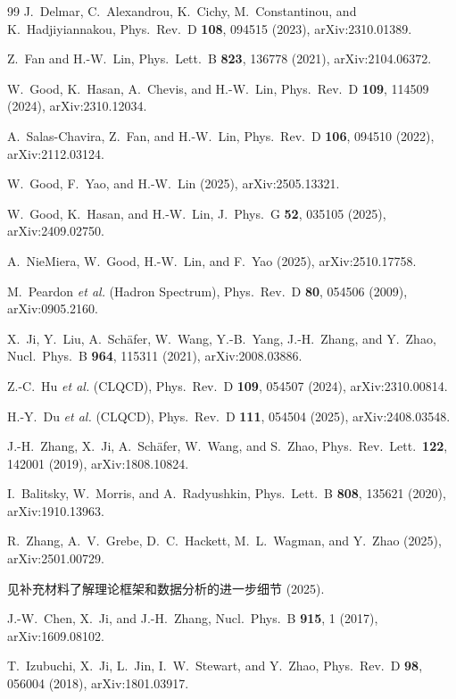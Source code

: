 \documentclass[12pt,a4paper]{ctexart}
\begin{document}
\begin{thebibliography}{99}
 J.~Delmar, C.~Alexandrou, K.~Cichy, M.~Constantinou, and K.~Hadjiyiannakou, Phys.\ Rev.\ D \textbf{108}, 094515 (2023), arXiv:2310.01389.

 Z.~Fan and H.-W.~Lin, Phys.\ Lett.\ B \textbf{823}, 136778 (2021), arXiv:2104.06372.

 W.~Good, K.~Hasan, A.~Chevis, and H.-W.~Lin, Phys.\ Rev.\ D \textbf{109}, 114509 (2024), arXiv:2310.12034.

 A.~Salas-Chavira, Z.~Fan, and H.-W.~Lin, Phys.\ Rev.\ D \textbf{106}, 094510 (2022), arXiv:2112.03124.

 W.~Good, F.~Yao, and H.-W.~Lin (2025), arXiv:2505.13321.

 W.~Good, K.~Hasan, and H.-W.~Lin, J.\ Phys.\ G \textbf{52}, 035105 (2025), arXiv:2409.02750.

 A.~NieMiera, W.~Good, H.-W.~Lin, and F.~Yao (2025), arXiv:2510.17758.

 M.~Peardon \textit{et al.} (Hadron Spectrum), Phys.\ Rev.\ D \textbf{80}, 054506 (2009), arXiv:0905.2160.

 X.~Ji, Y.~Liu, A.~Sch\"afer, W.~Wang, Y.-B.~Yang, J.-H.~Zhang, and Y.~Zhao, Nucl.\ Phys.\ B \textbf{964}, 115311 (2021), arXiv:2008.03886.

 Z.-C.~Hu \textit{et al.} (CLQCD), Phys.\ Rev.\ D \textbf{109}, 054507 (2024), arXiv:2310.00814.

 H.-Y.~Du \textit{et al.} (CLQCD), Phys.\ Rev.\ D \textbf{111}, 054504 (2025), arXiv:2408.03548.

 J.-H.~Zhang, X.~Ji, A.~Sch\"afer, W.~Wang, and S.~Zhao, Phys.\ Rev.\ Lett.\ \textbf{122}, 142001 (2019), arXiv:1808.10824.

 I.~Balitsky, W.~Morris, and A.~Radyushkin, Phys.\ Lett.\ B \textbf{808}, 135621 (2020), arXiv:1910.13963.

 R.~Zhang, A.~V.~Grebe, D.~C.~Hackett, M.~L.~Wagman, and Y.~Zhao (2025), arXiv:2501.00729.

 见补充材料了解理论框架和数据分析的进一步细节 (2025).

 J.-W.~Chen, X.~Ji, and J.-H.~Zhang, Nucl.\ Phys.\ B \textbf{915}, 1 (2017), arXiv:1609.08102.

 T.~Izubuchi, X.~Ji, L.~Jin, I.~W.~Stewart, and Y.~Zhao, Phys.\ Rev.\ D \textbf{98}, 056004 (2018), arXiv:1801.03917.


\end{thebibliography}
\end{document}
